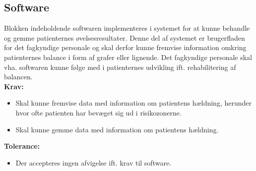 \subsection{Software}\label{subsec:software}
Blokken indeholdende softwaren implementeres i systemet for at kunne behandle og gemme patienternes øvelsesresultater. Denne del af systemet er brugerfladen for det fagkyndige personale og skal derfor kunne fremvise information omkring patienternes balance i form af grafer eller lignende. Det fagkyndige personale skal vha. softwaren kunne følge med i patienternes udvikling ift. rehabilitering af balancen. \\
\textbf{Krav:}
\begin{itemize}
	\item Skal kunne fremvise data med information om patientens hældning, herunder hvor ofte patienten har bevæget sig ud i risikozonerne. 
	\item Skal kunne gemme data med information om patientens hældning.
\end{itemize}
\textbf{Tolerance:}
\begin{itemize}
	\item Der accepteres ingen afvigelse ift. krav til software. 
\end{itemize}
